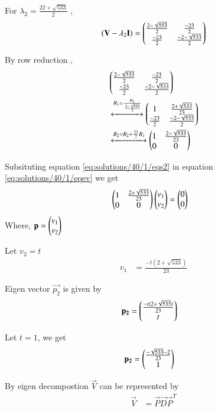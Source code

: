 For $\lambda_2=\frac{22+\sqrt{533}}{2}$ ,
\begin{align}
    (\mathbf{V}-\lambda_2\mathbf{I})=\begin{pmatrix}\frac{2-\sqrt{553}}{2} & \frac{-23}{2} \\\frac{-23}{2} & \frac{-2-\sqrt{533}}{2}\end{pmatrix}
\end{align}

By row reduction , 
\begin{align}
    &\begin{pmatrix}\frac{2-\sqrt{533}}{2} & \frac{-23}{2} \\\frac{-23}{2} & \frac{-2-\sqrt{533}}{2}\end{pmatrix}\\
   &\xleftrightarrow[]
{
R_1=\frac{R_1}{\frac{2-\sqrt{533}}{2}}
}
\begin{pmatrix}1 & \frac{2+\sqrt{533}}{23} \\\frac{-23}{2} & \frac{-2-\sqrt{533}}{2}\end{pmatrix}\\
    &\xleftrightarrow{R_2=R_2+\frac{23}{2}R_1}\begin{pmatrix}1 & \frac{2-\sqrt{533}}{23} \\0 & 0\end{pmatrix}\label{eq:solutions/40/1/eqs2}
\end{align} 

Subsituting equation \ref{eq:solutions/40/1/eqs2} in equation \ref{eq:solutions/40/1/eqev} we get 
\begin{align}
    &\begin{pmatrix}1 & \frac{2+\sqrt{533}}{23} \\0 & 0\end{pmatrix}\begin{pmatrix}v_1 \\ v_2\end{pmatrix}=\begin{pmatrix}0 \\ 0\end{pmatrix}
\end{align}
Where, $\mathbf{p}=\begin{pmatrix}v_1\\v_2\end{pmatrix}$

Let $v_2=t$
\begin{align}
    v_1&=\frac{-t(2+\sqrt{533})}{23}
\end{align}

Eigen vector $\vec{p_2}$ is given by
\begin{align}
        \mathbf{p_2}&=\begin{pmatrix}\frac{-t(2+\sqrt{533})}{23} \\ t\end{pmatrix}
\end{align}

Let $t=1$, we get 
\begin{align}
    \mathbf{p_2}&=\begin{pmatrix}\frac{-\sqrt{533}-2}{23} \\1 \end{pmatrix}\label{eq:solutions/40/1/eqp2}
\end{align}

By eigen decompostion $\vec{V}$ can be represented by
\begin{align}
    \vec{V}&=\vec{P}\vec{D}\vec{P}^T\label{eq:solutions/40/1/eqsubs}
\end{align}

